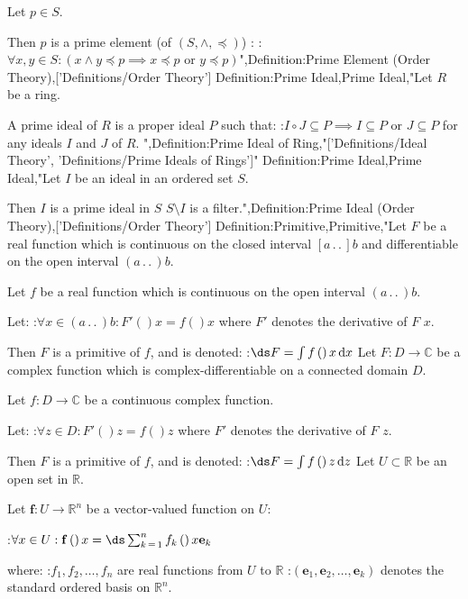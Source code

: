 Let $p \in S$.


Then $p$ is a prime element (of $\left( S, \wedge, \preceq \right)$) :
:$\forall x, y \in S: \left( x \wedge y \preceq p \implies x \preceq p \text { or } y \preceq p \right)$",Definition:Prime Element (Order Theory),['Definitions/Order Theory']
Definition:Prime Ideal,Prime Ideal,"Let $R$ be a ring.


A prime ideal of $R$ is a proper ideal $P$ such that:
:$I \circ J \subseteq P \implies I \subseteq P \text { or } J \subseteq P$
for any ideals $I$ and $J$ of $R$.
",Definition:Prime Ideal of Ring,"['Definitions/Ideal Theory', 'Definitions/Prime Ideals of Rings']"
Definition:Prime Ideal,Prime Ideal,"Let $I$ be an ideal in an ordered set $S$.


Then $I$ is a prime ideal in $S$  $S \setminus I$ is a filter.",Definition:Prime Ideal (Order Theory),['Definitions/Order Theory']
Definition:Primitive,Primitive,"Let $F$ be a real function which is continuous on the closed interval $\left[ a \,.\,.\,   \right]b$ and differentiable on the open interval $\left( a \,.\,.\,   \right)b$.

Let $f$ be a real function which is continuous on the open interval $\left( a \,.\,.\,   \right)b$.


Let:
:$\forall x \in \left( a \,.\,.\,   \right)b: F' \left(   \right)x = f \left(   \right)x$
where $F'$ denotes the derivative of $F$  $x$.


Then $F$ is a primitive of $f$, and is denoted:
:$\ds F = \int f \left(   \right)x \,\mathrm d x$
Let $F: D \to \mathbb C$ be a complex function which is complex-differentiable on a connected domain $D$.

Let $f: D \to \mathbb C$ be a continuous complex function.


Let:
:$\forall z \in D: F' \left(   \right)z = f \left(   \right)z$
where $F'$ denotes the derivative of $F$  $z$.


Then $F$ is a primitive of $f$, and is denoted:
:$\ds F = \int f \left(   \right)z \,\mathrm d z$
Let $U \subset \mathbb R$ be an open set in $\mathbb R$.

Let $\mathbf f: U \to \mathbb R^n$ be a vector-valued function on $U$:

:$\forall x \in U: \mathbf f \left(   \right)x = \ds \sum_{k \mathop = 1}^n f_k \left(   \right)x \mathbf e_k$

where:
:$f_1, f_2, \ldots, f_n$ are real functions from $U$ to $\mathbb R$
:$\left( \mathbf e_1, \mathbf e_2, \ldots, \mathbf e_k \right)$ denotes the standard ordered basis on $\mathbb R^n$.

